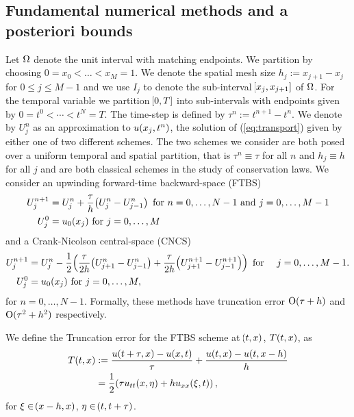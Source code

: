 \documentclass[final]{amsart}
\numberwithin{equation}{section}
\begin{document}
\subsection{Fundamental numerical methods and a posteriori bounds}\label{sec:example_aposteriori_bounds}

Let $\Omega$ denote the unit interval with matching endpoints. We
partition by choosing $0=x_0< \dots < x_{M}=1$. We denote the spatial
mesh size $ h_j := x_{j+1} - x_{j}$ for $0\leq j\leq M-1$ and we use
$I_j$ to denote the sub-interval $\!\left[{x_{j},x_{j+1}}\right]$ of $\Omega$. For the
temporal variable we partition $\!\left[{0,T}\right]$ into sub-intervals with
endpoints given by $0=t^0<\cdots<t^N=T$.  The time-step is defined by
$\tau^n:=t^{n+1}-t^n$. We denote by $U^n_j$ as an approximation to $
u\!\left({x_j, t^n}\right)$, the solution of (\ref{eq:transport}) given by either
one of two different schemes. The two schemes we consider are both
posed over a uniform temporal and spatial partition, that is $\tau^n
\equiv \tau$ for all $n$ and $h_j\equiv h$ for all $j$ and are both
classical schemes in the study of conservation laws. We consider an
upwinding forward-time backward-space (FTBS)
\begin{equation}
\label{eq:FTBS}
\begin{split}
U^{n+1}_j &= U^n_j + \frac{\tau}{h} \!\left({U^n_{j} - U^n_{j-1}}\right)
\text{ for } n=0,\dots, N-1 \text{ and } j=0,\dots, M-1
\\
U^0_j &= u_0(x_j) \text{ for } j=0, \dots, M
\end{split}
\end{equation}
and a Crank-Nicolson central-space (CNCS)
\begin{equation}
\label{eq:FTCS}
\begin{split}
U^{n+1}_j &= U^n_j - \frac{1}{2}\!\left({\frac{\tau}{2h}
	\!\left({U^n_{j+1}-U^n_{j-1}}\right) 
	+
	\frac{\tau}{2h}\!\left({U^{n+1}_{j+1}-U^{n+1}_{j-1}}\right)}\right)
\text{ for } \quad j=0,\dots, M-1.
\\
U^0_j &= u_0(x_j) \text{ for } j=0, \dots, M,
\end{split}
\end{equation}
for $n=0,\dots,N-1$.
Formally, these methods have truncation error $\operatorname{O}(\tau + h)$ and
$\operatorname{O}(\tau^2 + h^2)$ respectively.

 \begin{Defn}\label{defn:truncation_ftbs}
 	We define the Truncation error for the FTBS scheme at $\!\left({t,x}\right)$, $T\!\left({t,x}\right)$, as
 	\begin{equation}
 	\begin{aligned}
 	T\qp{t,x}&:=\frac{u\qp{t+\tau,x}-u\qp{x,t}}{\tau}+\frac{u\qp{t,x}-u\qp{t,x-h}}{h}\\
 	&=\frac{1}{2}\qp{ \tau u_{tt}\qp{x,\eta} +hu_{xx}\qp{\xi,t} },
 	\end{aligned}
 	\end{equation}
 	for $\xi\in\!\left({x-h,x}\right)$, $\eta \in\!\left({t, t+\tau}\right)$.
 \end{Defn}
\end{document}
